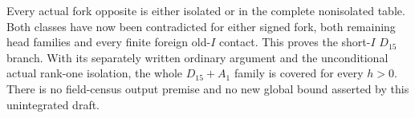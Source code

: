 Every actual fork opposite is either isolated or
in the complete nonisolated table.
Both classes have now been contradicted for either
signed fork, both remaining head families and
every finite foreign old-\(I\) contact.
This proves the short-\(I\) \(D_{15}\) branch.
With its separately written ordinary argument and
the unconditional actual rank-one isolation, the
whole \(D_{15}+A_1\) family is covered for every \(h>0\).
There is no field-census output premise and no
new global bound asserted by this unintegrated draft.


















